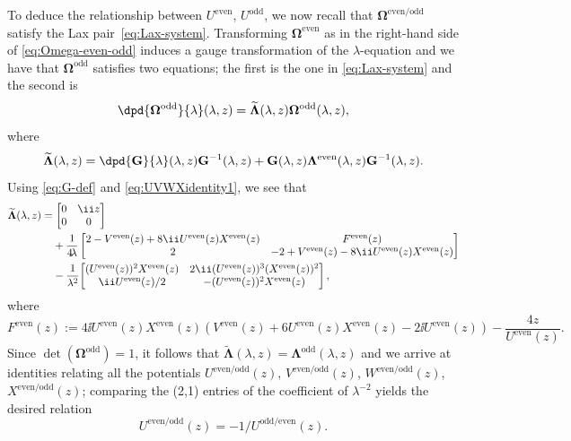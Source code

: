 To deduce the relationship between $U^{\mathrm{even}}$, $U^{\mathrm{odd}}$, we now recall that $\mathbf{\Omega}^{\mathrm{even/odd}}$ satisfy the Lax pair~\eqref{eq:Lax-system}. Transforming $\mathbf{\Omega}^{\mathrm{even}}$ as in the right-hand side of \eqref{eq:Omega-even-odd} induces a gauge transformation of the $\lambda$-equation and we have that $\mathbf{\Omega}^{\mathrm{odd}}$ satisfies two equations; the first is the one in \eqref{eq:Lax-system} and the second is
\[
\dpd{\mathbf{\Omega}^{\mathrm{odd}}}{\lambda}(\lambda, z) = \widetilde{\mathbf{\Lambda}}(\lambda, z) \mathbf{\Omega}^{\mathrm{odd}}(\lambda, z),
\]
where
\[
\widetilde{\mathbf{\Lambda}}(\lambda, z) = \dpd{\mathbf{G}}{\lambda}(\lambda, z) \mathbf{G}^{-1}(\lambda, z) + \mathbf{G}(\lambda, z) \mathbf{\Lambda}^{\mathrm{even}}(\lambda, z)\mathbf{G}^{-1}(\lambda, z).
\]
Using \eqref{eq:G-def} and \eqref{eq:UVWXidentity1}, we see that
\begin{align*}
& \widetilde{\mathbf{\Lambda}}(\lambda, z) = \begin{bmatrix} 0 & \ii z \\ 0 & 0 \end{bmatrix}\\
 & \hphantom{\widetilde{\mathbf{\Lambda}}(\lambda, z) =}{}
 + \dfrac{1}{4 \!\lambda}\begin{bmatrix} 2 - V^{\mathrm{even}}(z) + 8\ii U^{\mathrm{even}}(z)X^{\mathrm{even}}(z) & F^\mathrm{even}(z) \\ 2 & -2 + V^{\mathrm{even}}(z) - 8\ii U^{\mathrm{even}}(z)X^{\mathrm{even}}(z) \end{bmatrix} \\
 & \hphantom{\widetilde{\mathbf{\Lambda}}(\lambda, z) =}{} -\dfrac{1}{\lambda^2} \!\begin{bmatrix} (U^{\mathrm{even}}(z))^2 X^{\mathrm{even}}(z) & 2\ii (U^{\mathrm{even}}(z))^3(X^{\mathrm{even}}(z))^2 \\ \ii U^{\mathrm{even}}(z)/2 & - (U^{\mathrm{even}}(z))^2 X^{\mathrm{even}}(z)\end{bmatrix},
\end{align*}
where
\[
F^\mathrm{even}(z) := 4\ii U^{\mathrm{even}}(z) X^{\mathrm{even}}(z) \left(V^{\mathrm{even}}(z) + 6 U^{\mathrm{even}}(z) X^{\mathrm{even}}(z)-2 \ii U^{\mathrm{even}}(z) \right)- \dfrac{4z}{ U^{\mathrm{even}}(z)}.
\]
Since $\det(\mathbf{\Omega}^\mathrm{odd}) = 1$, it follows that $\widetilde{\mathbf{\Lambda}}(\lambda, z) = \mathbf{\Lambda}^{\mathrm{odd}}(\lambda, z)$ and we arrive at identities relating all the potentials $U^{\mathrm{even/odd}}(z)$, $V^{\mathrm{even/odd}}(z)$, $W^{\mathrm{even/odd}}(z)$, $X^{\mathrm{even/odd}}(z)$; comparing the (2,1) entries of the coefficient of $\lambda^{-2}$ yields the desired relation
\[
U^{\mathrm{even/odd}}(z) = -1/U^{\mathrm{odd/even}}(z).
\]


